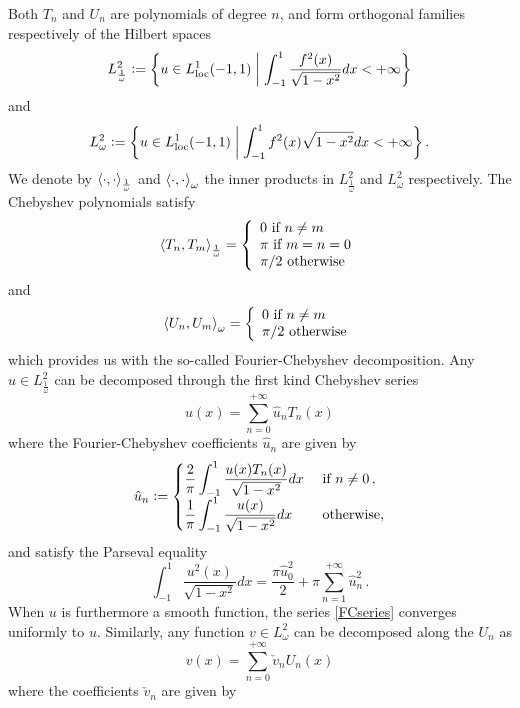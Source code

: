 \documentclass[a4paper]{article}
\begin{document}
Both $T_n$ and $U_n$ are polynomials of degree $n$, and form orthogonal families respectively of the Hilbert spaces 
$$L^2_{\frac{1}{\omega}} \mathrel{\mathop:}= \left\{u \in L^1_\textup{loc}(-1,1)\mathrel{}\middle|\mathrel{}\int_{-1}^{1} \dfrac{f^2(x)}{\sqrt{1 - x^2} }dx< + \infty\right\}$$
and 
$$L^2_{\omega} \mathrel{\mathop:}= \left\{u \in L^1_\textup{loc}(-1,1)\mathrel{}\middle|\mathrel{}\int_{-1}^{1} {f^2(x)}{\sqrt{1 - x^2} }dx< + \infty\right\}.$$
We denote by $\left\langle \cdot,\cdot\right\rangle_\frac{1}{\omega}$ and $\left\langle \cdot,\cdot\right\rangle_\omega$ the inner products in $L^2_{\frac{1}{\omega}}$ and $L^2_{\omega}$ respectively.
The Chebyshev polynomials satisfy
\begin{equation}
	\left\langle T_n,T_m\right\rangle_\frac{1}{\omega} = \left\{
	\begin{array}{l}
	0 \mbox{ if } n\ne m\\
	\pi \mbox{ if } m=n=0\\
	\pi/2 \mbox{ otherwise}
	\end{array} 
	\right.
\end{equation}
and
\begin{equation}
	\left\langle U_n,U_m\right\rangle_{\omega} = \left\{
	\begin{array}{l}
	0 \mbox{ if } n\ne m\\
	\pi/2 \mbox{ otherwise}
	\end{array} 
	\right.
\end{equation}
which provides us with the so-called Fourier-Chebyshev decomposition. Any
$u\in L^2_{\frac{1}{\omega}}$ can be decomposed through the first kind Chebyshev series 
\begin{equation}
	u(x) = \sum_{n=0}^{+\infty} \hat{u}_n T_n(x)
	\label{FCseries}
\end{equation}
where the Fourier-Chebyshev coefficients $\hat{u}_n$ are given by 
\[ \hat{u}_n \mathrel{\mathop:}= \begin{cases}
\dfrac{2}{\pi}\displaystyle\int_{-1}^{1} \dfrac{u(x) T_n(x)}{\sqrt{1-x^2}}dx & \text{ if } n \neq 0\,,\\
\dfrac{1}{\pi}\displaystyle\int_{-1}^{1} \dfrac{u(x)}{\sqrt{1-x^2}}dx & \text{ otherwise,}\\
\end{cases}\]
and satisfy the Parseval equality
\[ \int_{-1}^{1} \frac{u^2(x)}{\sqrt{1-x^2}} dx =  \frac{\pi \hat{u}_0^2}{2} + \pi\sum_{n=1}^{+\infty}\hat{u}_n^2\,.\]
When $u$ is furthermore a smooth function, the series \eqref{FCseries} converges uniformly to $u$. Similarly, any 
function $v\in L^2_{\omega}$ can be decomposed along the $U_n$ as
\[ v(x) = \sum_{n=0}^{+\infty} \check{v}_n U_n(x)\]
where the coefficients $\check{v}_n$ are given by 
\end{document}
